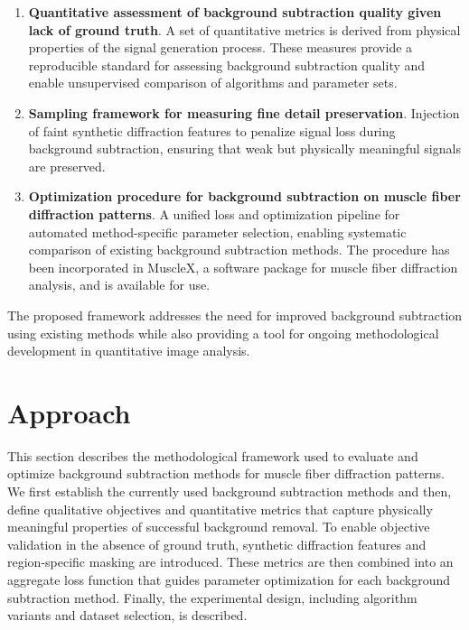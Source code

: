 \documentclass[iucr]{iucrjournals}
\begin{document}
\begin{enumerate}

\item \textbf{Quantitative assessment of background subtraction quality given lack of ground truth}. A set of quantitative metrics is derived from physical properties of the signal generation process. These measures provide a reproducible standard for assessing background subtraction quality and enable unsupervised comparison of algorithms and parameter sets.

\item \textbf{Sampling framework for measuring fine detail preservation}. Injection of faint synthetic diffraction features to penalize signal loss during background subtraction, ensuring that weak but physically meaningful signals are preserved.

\item \textbf{Optimization procedure for background subtraction on muscle fiber diffraction patterns}. A unified loss and optimization pipeline for automated method-specific parameter selection, enabling systematic comparison of existing background subtraction methods. The procedure has been incorporated in MuscleX, a software package for muscle fiber diffraction analysis, and is available for use.

\end{enumerate}


The proposed framework addresses the need for improved background subtraction using existing methods while also providing a tool for ongoing methodological development in quantitative image analysis.



\section{Approach}

This section describes the methodological framework used to evaluate and optimize background subtraction methods for muscle fiber diffraction patterns. We first establish the currently used background subtraction methods and then, define qualitative objectives and quantitative metrics that capture physically meaningful properties of successful background removal. To enable objective validation in the absence of ground truth, synthetic diffraction features and region-specific masking are introduced. These metrics are then combined into an aggregate loss function that guides parameter optimization for each background subtraction method. Finally, the experimental design, including algorithm variants and dataset selection, is described.
\end{document}

